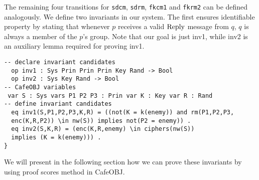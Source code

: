 \documentclass[a4paper,fleqn]{cas-dc}
\begin{document}
The remaining four transitions for \verb!sdcm!, \verb!sdrm!, \verb!fkcm1! and \verb!fkrm2! can be defined analogously.
We define two invariants in our system. The first ensures identifiable property by stating that whenever $p$ receives a valid $\rm Reply$ message from $q$, $q$ is always a member of the $p$'s group. Note that our goal is just inv1, while inv2 is an auxiliary lemma required for proving inv1.
\begin{small}
\begin{verbatim}
-- declare invariant candidates
  op inv1 : Sys Prin Prin Prin Key Rand -> Bool
  op inv2 : Sys Key Rand -> Bool
-- CafeOBJ variables
 var S : Sys vars P1 P2 P3 : Prin var K : Key var R : Rand
-- define invariant candidates
  eq inv1(S,P1,P2,P3,K,R) = ((not(K = k(enemy)) and rm(P1,P2,P3,
  enc(K,R,P2)) \in nw(S)) implies not(P2 = enemy)) .
  eq inv2(S,K,R) = (enc(K,R,enemy) \in ciphers(nw(S)) 
  implies (K = k(enemy))) .
}
\end{verbatim}
\end{small}
We will present in the following section how we can prove these invariants by using proof scores method in CafeOBJ.
\end{document}
